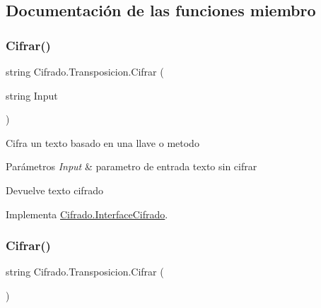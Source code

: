 \subsection{Documentación de las funciones miembro}
\mbox{\label{class_cifrado_1_1_transposicion_a34feeb193fcf5f9bf3385043dae4b4c8}} 
\subsubsection{\texorpdfstring{Cifrar()}{Cifrar()}\hspace{0.1cm}{\footnotesize\ttfamily [1/2]}}
{\footnotesize\ttfamily string Cifrado.\+Transposicion.\+Cifrar (\begin{DoxyParamCaption}\item[{string}]{Input }\end{DoxyParamCaption})}



Cifra un texto basado en una llave o metodo 


\begin{DoxyParams}{Parámetros}
{\em Input} & parametro de entrada texto sin cifrar\\
\hline
\end{DoxyParams}
\begin{DoxyReturn}{Devuelve}
texto cifrado
\end{DoxyReturn}


Implementa \hyperlink{interface_cifrado_1_1_interface_cifrado_a67baf37475e65a3cf07a0546309cf391}{Cifrado.\+Interface\+Cifrado}.

\mbox{\label{class_cifrado_1_1_transposicion_a3d6021ac06c306a6943e88c3678d97cf}} 
\subsubsection{\texorpdfstring{Cifrar()}{Cifrar()}\hspace{0.1cm}{\footnotesize\ttfamily [2/2]}}
{\footnotesize\ttfamily string Cifrado.\+Transposicion.\+Cifrar (\begin{DoxyParamCaption}{ }\end{DoxyParamCaption})}



